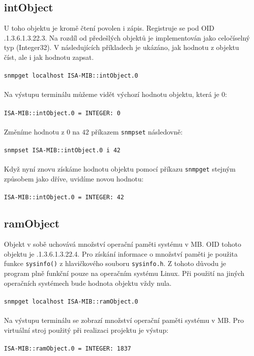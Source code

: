 \documentclass[a4paper,11pt]{article}
\begin{document}
		\subsection{intObject}
			U toho objektu je kromě čtení povolen i zápis. Registruje se pod OID .1.3.6.1.3.22.3. Na	rozdíl od předešlých objektů je implementován jako celočíselný typ (Integer32). V následujících příkladech je ukázáno, jak hodnotu z objektu číst, ale i jak hodnotu zapsat.\\\\
			\texttt{snmpget localhost ISA-MIB::intObject.0}\\\\
			Na výstupu terminálu můžeme vidět výchozí hodnotu objektu, která je $0$:\\\\
			\texttt{ISA-MIB::intObject.0 = INTEGER: 0}\\\\
			Změníme hodnotu z $0$ na $42$ příkazem \texttt{snmpset} následovně:\\\\
			\texttt{snmpset ISA-MIB::intObject.0 i 42}\\\\
			Když nyní znovu získáme hodnotu objektu pomocí příkazu \texttt{snmpget} stejným způsobem jako dříve, uvidíme novou hodnotu:\\\\
			\texttt{ISA-MIB::intObject.0 = INTEGER: 42}
			
		\subsection{ramObject}
			Objekt v sobě uchovává množství operační paměti systému v MB. OID tohoto objektu je .1.3.6.1.3.22.4. Pro získání informace o množství paměti je použita funkce \texttt{sysinfo()} z hlavičkového souboru \texttt{sysinfo.h}. Z tohoto důvodu je program plně funkční pouze na operačním systému Linux. Při použití na jiných operačních systémech bude hodnota objektu vždy nula.\\\\
			\texttt{snmpget localhost ISA-MIB::ramObject.0}\\\\
			Na výstupu terminálu se zobrazí množství operační paměti systému v MB. Pro  virtuální stroj použitý při realizaci projektu je výstup:\\\\
			\texttt{ISA-MIB::ramObject.0 = INTEGER: 1837}

	\newpage
	
	\renewcommand{\refname}{Literatura}
	
		
\end{document}
